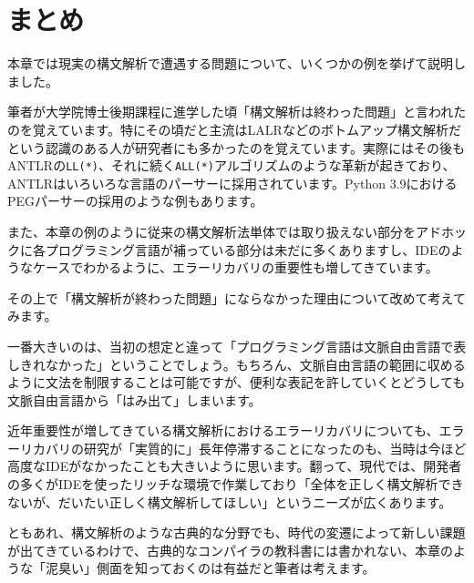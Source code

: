 \section{まとめ}

本章では現実の構文解析で遭遇する問題について、いくつかの例を挙げて説明しました。

筆者が大学院博士後期課程に進学した頃「構文解析は終わった問題」と言われたのを覚えています。特にその頃だと主流はLALRなどのボトムアップ構文解析だという認識のある人が研究者にも多かったのを覚えています。実際にはその後もANTLRの\texttt{LL(*)}、それに続く\texttt{ALL(*)}アルゴリズムのような革新が起きており、ANTLRはいろいろな言語のパーサーに採用されています。Python 3.9におけるPEGパーサーの採用のような例もあります。

また、本章の例のように従来の構文解析法単体では取り扱えない部分をアドホックに各プログラミング言語が補っている部分は未だに多くありますし、IDEのようなケースでわかるように、エラーリカバリの重要性も増してきています。

その上で「構文解析が終わった問題」にならなかった理由について改めて考えてみます。

一番大きいのは、当初の想定と違って「プログラミング言語は文脈自由言語で表しきれなかった」ということでしょう。もちろん、文脈自由言語の範囲に収めるように文法を制限することは可能ですが、便利な表記を許していくとどうしても文脈自由言語から「はみ出て」しまいます。

近年重要性が増してきている構文解析におけるエラーリカバリについても、エラーリカバリの研究が「実質的に」長年停滞することになったのも、当時は今ほど高度なIDEがなかったことも大きいように思います。翻って、現代では、開発者の多くがIDEを使ったリッチな環境で作業しており「全体を正しく構文解析できないが、だいたい正しく構文解析してほしい」というニーズが広くあります。

ともあれ、構文解析のような古典的な分野でも、時代の変遷によって新しい課題が出てきているわけで、古典的なコンパイラの教科書には書かれない、本章のような「泥臭い」側面を知っておくのは有益だと筆者は考えます。
